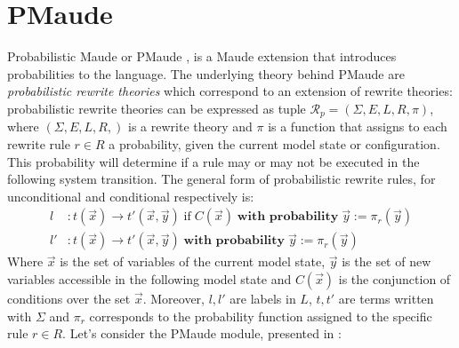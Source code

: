 \section{PMaude}
Probabilistic Maude or PMaude \cite{Agha2006}, is a Maude extension that introduces probabilities to the language. The underlying theory behind PMaude are  \textit{probabilistic rewrite theories} which correspond to an extension of rewrite theories: probabilistic rewrite theories can be expressed as tuple $\mathscr{R}_p = (\Sigma, E, L, R, \pi)$, where $(\Sigma, E, L, R,)$ is a rewrite theory and $\pi$ is a function that assigns to each rewrite rule $r \in R$ a probability, given the current model state or configuration. This probability will determine if a rule may or may not be executed in the following system transition. The general form of probabilistic rewrite rules, for unconditional and conditional respectively is:
\begin{align*}
    l &: t(\overrightarrow{x}) \rightarrow t'(\overrightarrow{x}, \overrightarrow{y}) \; \text{if} \; C(\overrightarrow{x}) \; \textbf{with probability} \; \overrightarrow{y} := \pi_r(\overrightarrow{y}) \\
    l' &: t(\overrightarrow{x}) \rightarrow t'(\overrightarrow{x}, \overrightarrow{y}) \; \textbf{with probability} \; \overrightarrow{y} := \pi_r(\overrightarrow{y})  
\end{align*}
Where $\overrightarrow{x}$ is the set of variables of the current model state,  $\overrightarrow{y}$ is the set of new variables accessible in the following model state and $C(\overrightarrow{x})$ is the conjunction of conditions over the set $\overrightarrow{x}$. Moreover, $l, l'$ are labels in $L$, $t,t'$ are terms written with $\Sigma$ and $\pi_r$ corresponds to the probability function assigned to the specific rule $r \in R$. 
Let's consider the PMaude module, presented in \cite{Agha2006}: 
